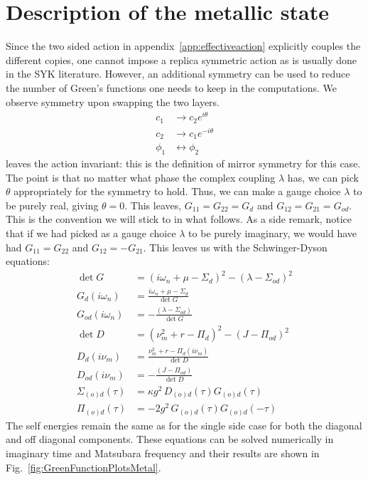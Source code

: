 \section{Description of the metallic state}
\label{sec:metallic-state}
%
Since the two sided action in appendix~\ref{app:effectiveaction} explicitly couples the different copies, one cannot impose a replica symmetric action as is usually done in the SYK literature. However, an additional symmetry can be used to reduce the number of Green's functions one needs to keep in the computations. 
We observe symmetry upon swapping the two layers. 
\begin{align}
    c_1 &\rightarrow c_2 e^{i\theta}\\
    c_2 &\rightarrow c_1 e^{-i\theta} \\
    \phi_1 &\leftrightarrow \phi_2  
    \label{eq:mirror_symmetry}
\end{align}
leaves the action invariant: this is the definition of mirror symmetry for this case. The point is that no matter what phase the complex coupling $\lambda$ has, we can pick $\theta$ appropriately for the symmetry to hold. Thus, we can make a gauge choice $\lambda$ to be purely real, giving $\theta = 0$. This leaves, $G_{11}=G_{22}=G_d$ and $G_{12} = G_{21} = G_{od}$. This is the convention we will stick to in what follows. As a side remark, notice that if we had picked as a gauge choice $\lambda$ to be purely imaginary, we would have had $G_{11} = G_{22}$ and $G_{12} = -G_{21}$. 
%
This leaves us with the Schwinger-Dyson equations: 
\begin{align}
    \det G &= (i\omega_n + \mu -\Sigma_d)^2 - (\lambda - \Sigma_{od})^2 \\
    G_d(i\omega_n) &= \frac{i\omega_n + \mu -\Sigma_d}{\det G}\\ 
    G_{od}(i\omega_n) &= -\frac{(\lambda - \Sigma_{od})}{\det G} \\
    \det D &= (\nu_m^2 + r - \Pi_d)^2 - (J - \Pi_{od})^2 \\
    D_d(i\nu_m) &= \frac{\nu_m^2 + r - \Pi_d(i\nu_m)}{\det D} \\
    D_{od}(i\nu_m) &= -\frac{(J - \Pi_{od})}{\det D}\\
    \Sigma_{(o)d}(\tau) &= \kappa g^2\, D_{(o)d}(\tau) G_{(o)d}(\tau)\\
    \Pi_{(o)d}(\tau) &= -2 g^2\, G_{(o)d}(\tau)G_{(o)d}(-\tau)
    \label{eq:SDeqnsmetal}
\end{align}
%
The self energies remain the same as for the single side case for both the diagonal and off diagonal components. These equations can be solved numerically in imaginary time and Matsubara frequency and their results are shown in Fig.~\ref{fig:GreenFunctionPlotsMetal}.
%
